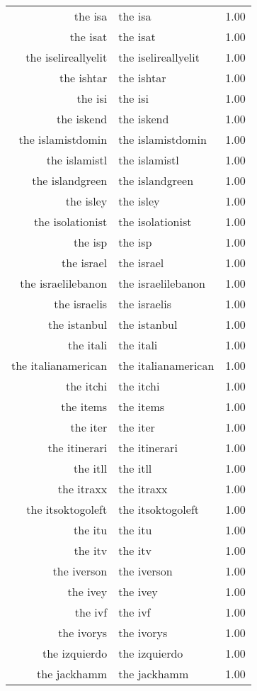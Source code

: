 \begin{table}[ht]
\begin{tabular}{rlr}
  the isa & the isa & 1.00 \\ 
  the isat & the isat & 1.00 \\ 
  the iselireallyelit & the iselireallyelit & 1.00 \\ 
  the ishtar & the ishtar & 1.00 \\ 
  the isi & the isi & 1.00 \\ 
  the iskend & the iskend & 1.00 \\ 
  the islamistdomin & the islamistdomin & 1.00 \\ 
  the islamistl & the islamistl & 1.00 \\ 
  the islandgreen & the islandgreen & 1.00 \\ 
  the isley & the isley & 1.00 \\ 
  the isolationist & the isolationist & 1.00 \\ 
  the isp & the isp & 1.00 \\ 
  the israel & the israel & 1.00 \\ 
  the israelilebanon & the israelilebanon & 1.00 \\ 
  the israelis & the israelis & 1.00 \\ 
  the istanbul & the istanbul & 1.00 \\ 
  the itali & the itali & 1.00 \\ 
  the italianamerican & the italianamerican & 1.00 \\ 
  the itchi & the itchi & 1.00 \\ 
  the items & the items & 1.00 \\ 
  the iter & the iter & 1.00 \\ 
  the itinerari & the itinerari & 1.00 \\ 
  the itll & the itll & 1.00 \\ 
  the itraxx & the itraxx & 1.00 \\ 
  the itsoktogoleft & the itsoktogoleft & 1.00 \\ 
  the itu & the itu & 1.00 \\ 
  the itv & the itv & 1.00 \\ 
  the iverson & the iverson & 1.00 \\ 
  the ivey & the ivey & 1.00 \\ 
  the ivf & the ivf & 1.00 \\ 
  the ivorys & the ivorys & 1.00 \\ 
  the izquierdo & the izquierdo & 1.00 \\ 
  the jackhamm & the jackhamm & 1.00 \\ 

\end{tabular}
\end{table}
